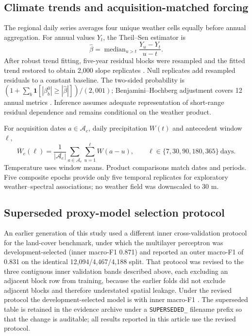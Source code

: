 \documentclass[10pt,a4paper]{article}
\begin{document}
\subsection{Climate trends and acquisition-matched forcing}
The regional daily series averages four unique weather cells equally before annual aggregation. For annual values $Y_t$, the Theil--Sen estimator is
\begin{equation}\label{eq:sen}
\widehat\beta=\operatorname{median}_{u>t}\frac{Y_u-Y_t}{u-t}.
\end{equation}
After robust trend fitting, five-year residual blocks were resampled and the fitted trend restored to obtain 2,000 slope replicates \citep{sen1968slope,yue2002autocorrelation}. Null replicates add resampled residuals to a constant baseline. The two-sided probability is $(1+\sum_b\mathbf1[|\beta_b^0|\geq|\widehat\beta|])/(2,001)$; Benjamini--Hochberg adjustment covers 12 annual metrics \citep{benjamini1995fdr}. Inference assumes adequate representation of short-range residual dependence and remains conditional on the weather product.

For acquisition dates $a\in\mathcal A_e$, daily precipitation $W(t)$ and antecedent window $\ell$,
\begin{equation}\label{eq:lags}
\overline W_e(\ell)=\frac{1}{|\mathcal A_e|}\sum_{a\in\mathcal A_e}
 \sum_{u=1}^{\ell}W(a-u),\qquad \ell\in\{7,30,90,180,365\}\ \mathrm{days}.
\end{equation}
Temperature uses window means. Product comparisons match dates and periods. Five composite epochs provide only five temporal replicates for exploratory weather--spectral associations; no weather field was downscaled to 30 m.




\subsection{Superseded proxy-model selection protocol}
An earlier generation of this study used a different inner cross-validation protocol for the land-cover benchmark, under which the multilayer perceptron was development-selected (inner macro-F1 0.871) and reported an outer macro-F1 of 0.831 on the identical 12,094/4,467/4,188 split. That protocol was revised to the three contiguous inner validation bands described above, each excluding an adjacent block row from training, because the earlier folds did not exclude adjacent blocks and therefore understated spatial leakage. Under the revised protocol the development-selected model is \ExtensionModel{} with inner macro-F1 \ExtensionCV{}. The superseded table is retained in the evidence archive under a \texttt{SUPERSEDED\_} filename prefix so that the change is auditable; all results reported in this article use the revised protocol.
\end{document}
